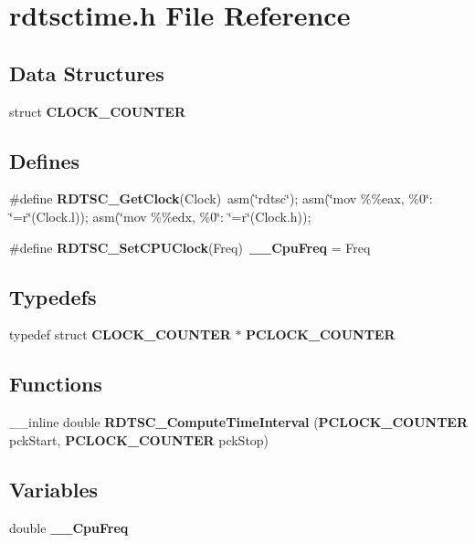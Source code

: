 \section{rdtsctime.h File Reference}
\label{rdtsctime_8h}
\subsection*{Data Structures}
\begin{DoxyCompactItemize}
\item 
struct {\bf CLOCK\_\-COUNTER}
\end{DoxyCompactItemize}
\subsection*{Defines}
\begin{DoxyCompactItemize}
\item 
\#define {\bf RDTSC\_\-GetClock}(Clock)~asm(\char`\"{}rdtsc\char`\"{});	asm(\char`\"{}mov \%\%eax, \%0\char`\"{}: \char`\"{}=r\char`\"{}(Clock.l));	asm(\char`\"{}mov \%\%edx, \%0\char`\"{}: \char`\"{}=r\char`\"{}(Clock.h));
\item 
\#define {\bf RDTSC\_\-SetCPUClock}(Freq)~{\bf \_\-\_\-CpuFreq} = Freq
\end{DoxyCompactItemize}
\subsection*{Typedefs}
\begin{DoxyCompactItemize}
\item 
typedef struct {\bf CLOCK\_\-COUNTER} $\ast$ {\bf PCLOCK\_\-COUNTER}
\end{DoxyCompactItemize}
\subsection*{Functions}
\begin{DoxyCompactItemize}
\item 
\_\-\_\-inline double {\bf RDTSC\_\-ComputeTimeInterval} ({\bf PCLOCK\_\-COUNTER} pckStart, {\bf PCLOCK\_\-COUNTER} pckStop)
\end{DoxyCompactItemize}
\subsection*{Variables}
\begin{DoxyCompactItemize}
\item 
double {\bf \_\-\_\-CpuFreq}
\end{DoxyCompactItemize}


